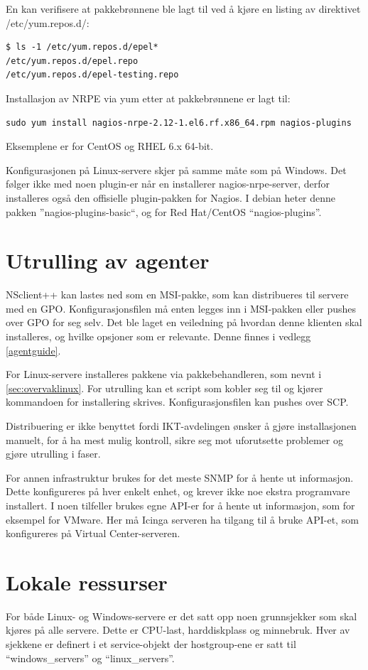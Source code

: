 En kan verifisere at pakkebrønnene ble lagt til ved å kjøre en listing av direktivet /etc/yum.repos.d/:
\begin{lstlisting}[style=example]
$ ls -1 /etc/yum.repos.d/epel*
/etc/yum.repos.d/epel.repo
/etc/yum.repos.d/epel-testing.repo
\end{lstlisting}

Installasjon av NRPE via yum etter at pakkebrønnene er lagt til:
\begin{lstlisting}[style=example]
sudo yum install nagios-nrpe-2.12-1.el6.rf.x86_64.rpm nagios-plugins
\end{lstlisting}

Eksemplene er for CentOS og RHEL 6.x 64-bit.

Konfigurasjonen på Linux-servere skjer på samme måte som på Windows. Det følger ikke med noen plugin-er når en installerer nagios-nrpe-server, derfor installeres også den offisielle plugin-pakken for Nagios. I debian heter denne pakken ''nagios-plugins-basic``, og for Red Hat/CentOS ``nagios-plugins''.

\section{Utrulling av agenter}
NSclient++ kan lastes ned som en MSI-pakke, som kan distribueres til servere med en GPO. Konfigurasjonsfilen må enten legges inn i MSI-pakken eller pushes over GPO for seg selv. Det ble laget en veiledning på hvordan denne klienten skal installeres, og hvilke opsjoner som er relevante. Denne finnes i vedlegg \ref{agentguide}.

For Linux-servere installeres pakkene via pakkebehandleren, som nevnt i \ref{sec:overvaklinux}. For utrulling kan et script som kobler seg til og kjører kommandoen for installering skrives. Konfigurasjonsfilen kan pushes over SCP.

Distribuering er ikke benyttet fordi IKT-avdelingen ønsker å gjøre installasjonen manuelt, for å ha mest mulig kontroll, sikre seg mot uforutsette problemer og gjøre utrulling i faser.
 
For annen infrastruktur brukes for det meste SNMP for å hente ut informasjon. Dette konfigureres på hver enkelt enhet, og krever ikke noe ekstra programvare installert. I noen tilfeller brukes egne API-er for å hente ut informasjon, som for eksempel for VMware. Her må Icinga serveren ha tilgang til å bruke API-et, som konfigureres på Virtual Center-serveren.

\section{Lokale ressurser}
For både Linux- og Windows-servere er det satt opp noen grunnsjekker som skal kjøres på alle servere. Dette er CPU-last, harddiskplass og minnebruk. Hver av sjekkene er definert i et service-objekt der hostgroup-ene er satt til ``windows\_servers'' og ``linux\_servers''. 

